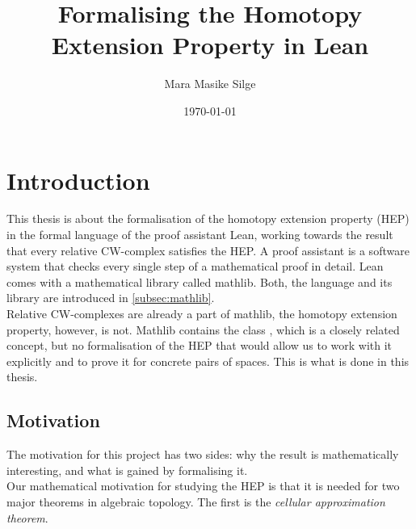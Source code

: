 \documentclass[11pt, a4paper, english]{article}
\author{Mara Masike Silge}
\date{\today}
\title{Formalising the Homotopy Extension Property in Lean}
\theoremstyle{plain}
\theoremstyle{definition}
\theoremstyle{remark}
\numberwithin{equation}{section}
\numberwithin{theorem}{section}
\begin{document}
\maketitle
\begin{flushright}
\end{flushright}

\clearpage
\tableofcontents

\clearpage
\section{Introduction} \label{section:Introduction}

This thesis is about the formalisation of the homotopy extension property (HEP) in the formal language of the proof assistant Lean, working towards the result that every relative CW-complex satisfies the HEP. A proof assistant is a software system that checks every single step of a mathematical proof in detail. Lean comes with a mathematical library called mathlib. Both, the language and its library are introduced in \cref{subsec:mathlib}. \\
Relative CW-complexes are already a part of mathlib, the homotopy extension property, however, is not. Mathlib contains the class , which is a closely related concept, but no formalisation of the HEP that would allow us to work with it explicitly and to prove it for concrete pairs of spaces. This is what is done in this thesis. %

\subsection*{Motivation} 
The motivation for this project has two sides: why the result is mathematically interesting, and what is gained by formalising it.\\
Our mathematical motivation for studying the HEP is that it is needed for two major theorems in algebraic topology. The first is the \emph{cellular approximation theorem}.
\end{document}
